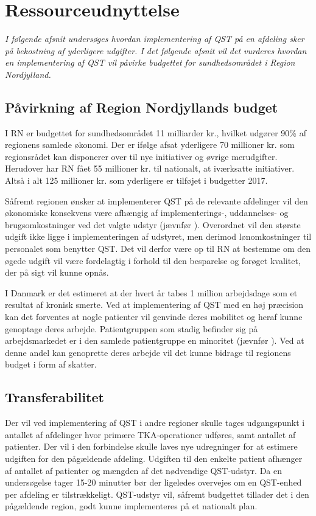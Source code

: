 \section{Ressourceudnyttelse}
\textit{I følgende afsnit undersøges hvordan implementering af QST på en afdeling sker på bekostning af yderligere udgifter. I det følgende afsnit vil det vurderes hvordan en implementering af QST vil påvirke budgettet for sundhedsområdet i Region Nordjylland.}

\subsection{Påvirkning af Region Nordjyllands budget}
I RN er budgettet for sundhedsområdet 11 milliarder kr., hvilket udgører 90\% af regionens samlede økonomi. \citep{RnBudget17}  Der er ifølge  afsat yderligere 70 millioner kr. som regionsrådet kan disponerer over til nye initiativer og øvrige merudgifter. Herudover har RN fået 55 millioner kr. til nationalt, at iværksatte initiativer. Altså i alt 125 millioner kr. som yderligere er tilføjet i budgetter 2017.

Såfremt regionen ønsker at implementerer QST på de relevante afdelinger vil den økonomiske konsekvens være afhængig af implementerings-, uddannelses- og brugsomkostninger ved det valgte udstyr (jævnfør ). Overordnet vil den største udgift ikke ligge i implementeringen af udstyret, men derimod lønomkostninger til personalet som benytter QST. Det vil derfor være op til RN at bestemme om den øgede udgift vil være fordelagtig i forhold til den besparelse og forøget kvalitet, der på sigt vil kunne opnås. 

I Danmark er det estimeret at der hvert år tabes 1 million arbejdsdage som et resultat af kronisk smerte. \citep{Eriksen2006} Ved at implementering af QST med en høj præcision kan det forventes at nogle patienter vil genvinde deres mobilitet og heraf kunne genoptage deres arbejde. Patientgruppen som stadig befinder sig på arbejdsmarkedet er i den samlede patientgruppe en minoritet (jævnfør ). Ved at denne andel kan genoprette deres arbejde vil det kunne bidrage til regionens budget i form af skatter.

\subsection{Transferabilitet}
Der vil ved implementering af QST i andre regioner skulle tages udgangspunkt i antallet af afdelinger hvor primære TKA-operationer udføres, samt antallet af patienter. Der vil i den forbindelse skulle laves nye udregninger for at estimere udgiften for den pågældende afdeling. Udgiften til den enkelte patient afhænger af antallet af patienter og mængden af det nødvendige QST-udstyr. Da en undersøgelse tager 15-20 minutter bør der ligeledes overvejes om en QST-enhed per afdeling er tilstrækkeligt. QST-udstyr vil, såfremt budgettet tillader det i den pågældende region, godt kunne implementeres på et nationalt plan.


